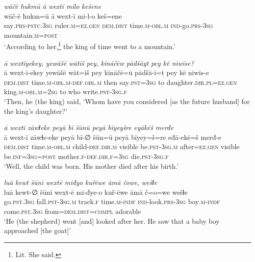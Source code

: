 \ea \label{KŠ.3}
\textit{wāčē ħukmū ā wextī milo kešene} \\ 
\gll wāč-ē ħukm=ū ā wext-ī mi-l-o keš=ene \\ 
 say\textsc{.prs}\textsc{-pstc}\textsc{.3sg} ruler\textsc{.m}\textsc{=ez.gen} \textsc{dem.dist} time\textsc{.m}\textsc{-obl}\textsc{.m} \textsc{ind-}go\textsc{.prs}\textsc{-3sg} mountain\textsc{.m}\textsc{=\textsc{post}} \\ 
\glt `According to her,\footnote{Lit. She said.} the king of time went to a mountain.'
\z 
 
\ea \label{KŠ.15}
\textit{ā wextīyekey, yewāšē wātiš pey, kināčēw pādšāyt pey kē niwīse?} \\ 
\gll ā wext-ī-ekey yewāšē wāt=iš pey kināčē=ū pādšā-ī=t pey kē niwīs-e \\ 
 \textsc{dem.dist} time\textsc{.m}\textsc{-obl}\textsc{.m}\textsc{-def}\textsc{.obl}\textsc{.m} then say\textsc{.pst}\textsc{=3sg} to daughter\textsc{.dir}\textsc{.pl}\textsc{=ez.gen} king\textsc{.m}\textsc{-obl}\textsc{.m}\textsc{=\textsc{2sg}} to who write\textsc{.pst}\textsc{-3sg}\textsc{.f} \\ 
\glt `Then, he (the king) said, ‘Whom have you considered [as the future husband] for the king’s daughter?'
\z 
 
\ea \label{KŠ.23}
\textit{ā wextī zāwɫeke peyā bī šūnū peyā bīyeyšre eyākēš merđe} \\ 
\gll ā wext-ī zāwɫe-eke peyā bī-∅ šūn=ū peyā bīyey=š=re eđā-ekē=š merđ-e \\ 
 \textsc{dem.dist} time\textsc{.m}\textsc{-obl}\textsc{.m} child\textsc{-def}\textsc{.dir}\textsc{.m} visible be\textsc{.pst}\textsc{-3sg}\textsc{.m} after\textsc{=ez.gen} visible be\textsc{.inf}\textsc{=3sg}\textsc{=\textsc{post}} mother\textsc{.f}\textsc{-def}\textsc{.dir}\textsc{.f}\textsc{=3sg} die\textsc{.pst}\textsc{-3sg}\textsc{.f} \\ 
\glt `Well, the child was born. His mother died after his birth.'
\z 
 
\ea \label{KŠ.30}
\textit{luā kewt šūnī wextē miđyo kuřēwe āmā čowe, wešɫe} \\ 
\gll luā kewt-∅ šūnī wext-ē mi-đye-o kuř-ēwe āmā č=o=we wešɫe \\ 
 go\textsc{.pst}\textsc{.3sg} fall\textsc{.pst}\textsc{-3sg}\textsc{.m} track\textsc{.f} time\textsc{.m}\textsc{-indf} \textsc{ind-}look\textsc{.prs}\textsc{-3sg} boy\textsc{.m}\textsc{-indf} come\textsc{.pst}\textsc{.3sg} from=\textsc{dem.dist}\textsc{=compl} adorable \\ 
\glt `He (the shepherd) went [and] looked after her. He saw that a baby boy approached [the goat]'
\z 
 
